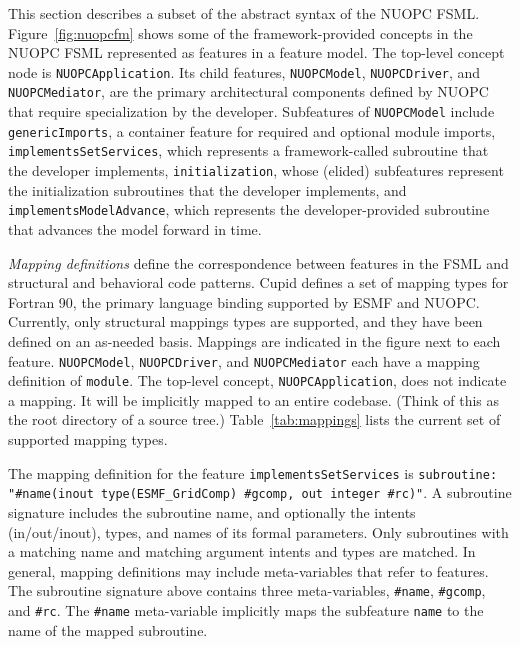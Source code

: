 \documentclass[oneside,11pt]{memoir}
\begin{document}
This section describes a subset of the abstract syntax of the NUOPC FSML. Figure~\ref{fig:nuopcfm} shows some of the framework-provided concepts in the NUOPC FSML represented as features in a feature model. The top-level concept node is \texttt{NUOPCApplication}. Its child features, \texttt{NUOPCModel}, \texttt{NUOPCDriver}, and \texttt{NUOPCMediator}, are the primary architectural components defined by NUOPC that require specialization by the developer. Subfeatures of \texttt{NUOPCModel} include \texttt{genericImports}, a container feature for required and optional module imports, \texttt{implementsSetServices}, which represents a framework-called subroutine that the developer implements, \texttt{initialization}, whose (elided) subfeatures represent the initialization subroutines that the developer implements, and \texttt{implementsModelAdvance}, which represents the developer-provided subroutine that advances the model forward in time.

\emph{Mapping definitions} define the correspondence between features in the FSML and structural and behavioral code patterns. Cupid defines	 a set of mapping types for Fortran 90, the primary language binding supported by ESMF and NUOPC. Currently, only structural mappings types are supported, and they have been defined on an as-needed basis. Mappings are indicated in the figure next to each feature. \texttt{NUOPCModel}, \texttt{NUOPCDriver}, and \texttt{NUOPCMediator} each have a mapping definition of \texttt{module}. The top-level concept, \texttt{NUOPCApplication}, does not indicate a mapping. It will be implicitly mapped to an entire codebase. (Think of this as the root directory of a source tree.) Table~\ref{tab:mappings} lists the current set of supported mapping types.

The mapping definition for the feature \texttt{implementsSetServices} is \texttt{subroutine: "\#name(inout type(ESMF\_GridComp) \#gcomp, out integer \#rc)"}. A subroutine signature includes the subroutine name, and optionally the intents (in/out/inout), types, and names of its formal parameters. Only subroutines with a matching name and matching argument intents and types are matched. In general, mapping definitions may include meta-variables that refer to features. The subroutine signature above contains three meta-variables, \texttt{\#name}, \texttt{\#gcomp}, and \texttt{\#rc}. The \texttt{\#name} meta-variable implicitly maps the subfeature \texttt{name} to the name of the mapped subroutine.

\end{document}
